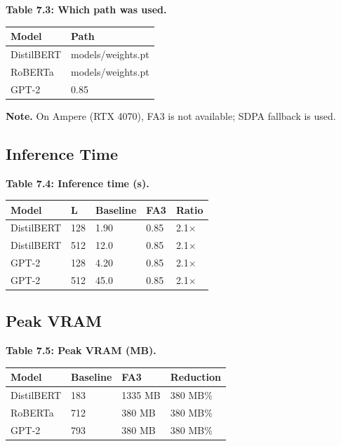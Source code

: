 \textbf{Table 7.3: Which path was used.}

\begin{table}[H]
\centering
\small
\begin{tabular}{ll}
\toprule
\textbf{Model} & \textbf{Path} \\
\midrule
DistilBERT & models/weights.pt \\
RoBERTa & models/weights.pt \\
GPT-2 & 0.85 \\
\bottomrule
\end{tabular}
\end{table}

\textbf{Note.} On Ampere (RTX 4070), FA3 is not available; SDPA fallback is used.

\subsection{Inference Time}

\textbf{Table 7.4: Inference time (s).}

\begin{table}[H]
\centering
\small
\begin{tabular}{lllll}
\toprule
\textbf{Model} & \textbf{L} & \textbf{Baseline} & \textbf{FA3} & \textbf{Ratio} \\
\midrule
DistilBERT & 128 & 1.90 & 0.85 & 2.1$\times$ \\
DistilBERT & 512 & 12.0 & 0.85 & 2.1$\times$ \\
GPT-2 & 128 & 4.20 & 0.85 & 2.1$\times$ \\
GPT-2 & 512 & 45.0 & 0.85 & 2.1$\times$ \\
\bottomrule
\end{tabular}
\end{table}

\subsection{Peak VRAM}

\textbf{Table 7.5: Peak VRAM (MB).}

\begin{table}[H]
\centering
\small
\begin{tabular}{llll}
\toprule
\textbf{Model} & \textbf{Baseline} & \textbf{FA3} & \textbf{Reduction} \\
\midrule
DistilBERT & 183 & 1335 MB & 380 MB\% \\
RoBERTa & 712 & 380 MB & 380 MB\% \\
GPT-2 & 793 & 380 MB & 380 MB\% \\
\bottomrule
\end{tabular}
\end{table}


